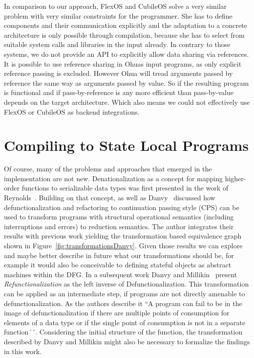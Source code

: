 In comparison to our approach, FlexOS and CubileOS solve a very similar problem with very similar constraints for the programmer. She has to define components and their communication explicitly and the adaptation to a concrete architecture is only possible through compilation, because she has to select from suitable system calls and libraries in the input already. In contrary to those systems, we do not provide an API to explicitly allow data sharing via references. It is possible to use reference sharing in Ohuas input programs, as only explicit reference passing is excluded. However Ohua will tread arguments passed by reference the same way as arguments passed by value. So if the resulting program is functional and if pass-by-reference is any more efficient than pass-by-value depends on the target architecture. Which also means we could not effectively use FlexOS or CubileOS as backend integrations.


\section{Compiling to State Local Programs}

Of course, many of the problems and approaches that emerged in the implementation are not new. Denationalization as a concept for mapping higher-order functions to serializable data types was first presented in the work of Reynolds~\cite{reynolds1972definitional}. Building on that concept, as well as Danvy~\cite{danvy2008defunctionalized} discussed how defunctionalization and refactoring to continuation passing style (CPS) can be used to transform programs with structural operational semantics (including interruptions and errors) to reduction semantics. The author integrates their results with previous work yielding the transformation based equivalence graph shown in Figure~\ref{fig:transformationsDanvy}. Given those results we can explore and maybe better describe in future what our transformations should be, for example it would also be conceivable to defining stateful objects as abstract machines within the DFG. In a subsequent work Danvy and Millikin~\cite{DANVY2009534} present \emph{Refunctionalization} as the left inverse of Defunctionalization. This transformation can be applied as an intermediate step, if programs are not directly amenable to defunctionalization. As the authors describe it ``A program can fail to be in the image of defunctionalization if there are multiple points of consumption for elements of a data type or if the single point of consumption is not in a separate function´´. Considering the initial structure of the  function, the transformation described by Danvy and Millikin might also be necessary to formalize the findings in this work.

